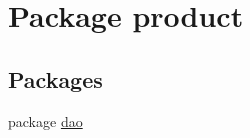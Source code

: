 \hypertarget{namespaceproduct}{}\section{Package product}
\label{namespaceproduct}
\subsection*{Packages}
\begin{DoxyCompactItemize}
\item 
package \mbox{\hyperlink{namespaceproduct_1_1dao}{dao}}
\end{DoxyCompactItemize}
